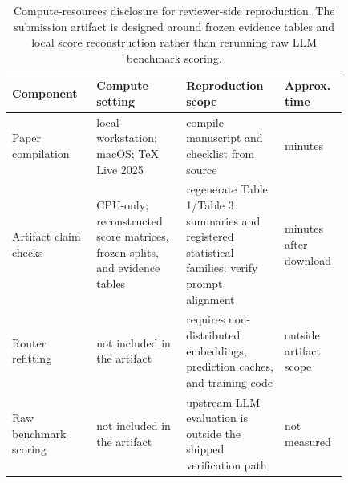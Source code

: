 \documentclass{article}
\begin{document}
\begin{table}[htbp]
  \caption{Compute-resources disclosure for reviewer-side reproduction. The submission artifact is designed around frozen evidence tables and local score reconstruction rather than rerunning raw LLM benchmark scoring.}
  \label{tab:app-compute}
  \centering
  \scriptsize
  \begin{tabular}{p{0.20\linewidth}p{0.24\linewidth}p{0.26\linewidth}p{0.13\linewidth}}
    \toprule
    Component & Compute setting & Reproduction scope & Approx. time \\
    \midrule
    Paper compilation & local workstation; macOS; TeX Live 2025 & compile manuscript and checklist from source & minutes \\
    Artifact claim checks & CPU-only; reconstructed score matrices, frozen splits, and evidence tables & regenerate Table 1/Table 3 summaries and registered statistical families; verify prompt alignment & minutes after download \\
    Router refitting & not included in the artifact & requires non-distributed embeddings, prediction caches, and training code & outside artifact scope \\
    Raw benchmark scoring & not included in the artifact & upstream LLM evaluation is outside the shipped verification path & not measured \\
    \bottomrule
  \end{tabular}
\end{table}
\end{document}
